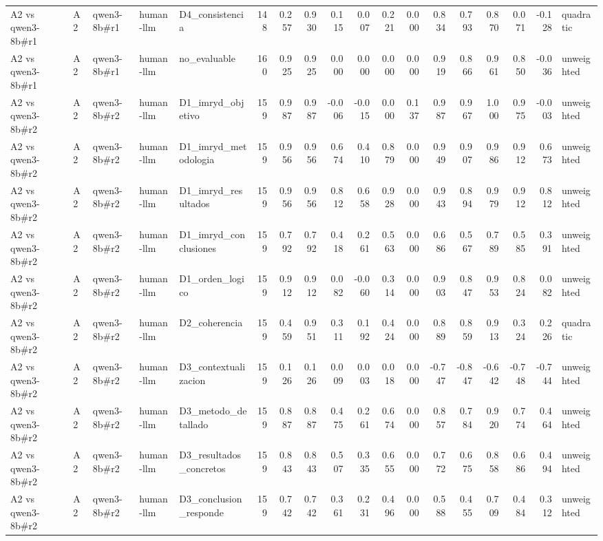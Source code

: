 \begin{table}
{\begin{tabular}{lllllrrrrrrrrrrrrl}
A2 vs qwen3-8b\#r1 & A2 & qwen3-8b\#r1 & human-llm & D4\_consistencia & 148 & 0.257 & 0.930 & 0.115 & 0.007 & 0.221 & 0.000 & 0.834 & 0.793 & 0.870 & 0.071 & -0.128 & quadratic \\
A2 vs qwen3-8b\#r1 & A2 & qwen3-8b\#r1 & human-llm & no\_evaluable & 160 & 0.925 & 0.925 & 0.000 & 0.000 & 0.000 & 0.000 & 0.919 & 0.866 & 0.961 & 0.850 & -0.036 & unweighted \\
A2 vs qwen3-8b\#r2 & A2 & qwen3-8b\#r2 & human-llm & D1\_imryd\_objetivo & 159 & 0.987 & 0.987 & -0.006 & -0.015 & 0.000 & 0.137 & 0.987 & 0.967 & 1.000 & 0.975 & -0.003 & unweighted \\
A2 vs qwen3-8b\#r2 & A2 & qwen3-8b\#r2 & human-llm & D1\_imryd\_metodologia & 159 & 0.956 & 0.956 & 0.674 & 0.410 & 0.879 & 0.000 & 0.949 & 0.907 & 0.986 & 0.912 & 0.673 & unweighted \\
A2 vs qwen3-8b\#r2 & A2 & qwen3-8b\#r2 & human-llm & D1\_imryd\_resultados & 159 & 0.956 & 0.956 & 0.812 & 0.658 & 0.928 & 0.000 & 0.943 & 0.894 & 0.979 & 0.912 & 0.812 & unweighted \\
A2 vs qwen3-8b\#r2 & A2 & qwen3-8b\#r2 & human-llm & D1\_imryd\_conclusiones & 159 & 0.792 & 0.792 & 0.418 & 0.261 & 0.563 & 0.000 & 0.686 & 0.567 & 0.789 & 0.585 & 0.391 & unweighted \\
A2 vs qwen3-8b\#r2 & A2 & qwen3-8b\#r2 & human-llm & D1\_orden\_logico & 159 & 0.912 & 0.912 & 0.082 & -0.060 & 0.314 & 0.000 & 0.903 & 0.847 & 0.953 & 0.824 & 0.082 & unweighted \\
A2 vs qwen3-8b\#r2 & A2 & qwen3-8b\#r2 & human-llm & D2\_coherencia & 159 & 0.459 & 0.951 & 0.311 & 0.192 & 0.424 & 0.000 & 0.889 & 0.859 & 0.913 & 0.324 & 0.226 & quadratic \\
A2 vs qwen3-8b\#r2 & A2 & qwen3-8b\#r2 & human-llm & D3\_contextualizacion & 159 & 0.126 & 0.126 & 0.009 & 0.003 & 0.018 & 0.000 & -0.747 & -0.847 & -0.642 & -0.748 & -0.744 & unweighted \\
A2 vs qwen3-8b\#r2 & A2 & qwen3-8b\#r2 & human-llm & D3\_metodo\_detallado & 159 & 0.887 & 0.887 & 0.475 & 0.261 & 0.674 & 0.000 & 0.857 & 0.784 & 0.920 & 0.774 & 0.464 & unweighted \\
A2 vs qwen3-8b\#r2 & A2 & qwen3-8b\#r2 & human-llm & D3\_resultados\_concretos & 159 & 0.843 & 0.843 & 0.507 & 0.335 & 0.655 & 0.000 & 0.772 & 0.675 & 0.858 & 0.686 & 0.494 & unweighted \\
A2 vs qwen3-8b\#r2 & A2 & qwen3-8b\#r2 & human-llm & D3\_conclusion\_responde & 159 & 0.742 & 0.742 & 0.361 & 0.231 & 0.496 & 0.000 & 0.588 & 0.455 & 0.709 & 0.484 & 0.312 & unweighted \\

\end{tabular}}
\end{table}
